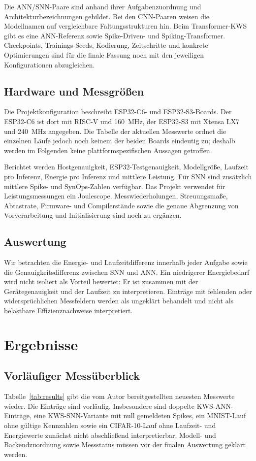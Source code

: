 \documentclass[11pt,a4paper]{article}
\begin{document}
Die ANN/SNN-Paare sind anhand ihrer Aufgabenzuordnung und Architekturbezeichnungen gebildet. Bei den CNN-Paaren weisen die Modellnamen auf vergleichbare Faltungsstrukturen hin. Beim Transformer-KWS gibt es eine ANN-Referenz sowie Spike-Driven- und Spiking-Transformer. Checkpoints, Trainings-Seeds, Kodierung, Zeitschritte und konkrete Optimierungen sind für die finale Fassung noch mit den jeweiligen Konfigurationen abzugleichen.

\subsection{Hardware und Messgrößen}
Die Projektkonfiguration beschreibt ESP32-C6- und ESP32-S3-Boards. Der ESP32-C6 ist dort mit RISC-V und 160~MHz, der ESP32-S3 mit Xtensa LX7 und 240~MHz angegeben. Die Tabelle der aktuellen Messwerte ordnet die einzelnen Läufe jedoch noch keinem der beiden Boards eindeutig zu; deshalb werden im Folgenden keine plattformspezifischen Aussagen getroffen.

Berichtet werden Hostgenauigkeit, ESP32-Testgenauigkeit, Modellgröße, Laufzeit pro Inferenz, Energie pro Inferenz und mittlere Leistung. Für SNN sind zusätzlich mittlere Spike- und SynOps-Zahlen verfügbar. Das Projekt verwendet für Leistungsmessungen ein Joulescope. Messwiederholungen, Streuungsmaße, Abtastrate, Firmware- und Compilerstände sowie die genaue Abgrenzung von Vorverarbeitung und Initialisierung sind noch zu ergänzen.

\subsection{Auswertung}
Wir betrachten die Energie- und Laufzeitdifferenz innerhalb jeder Aufgabe sowie die Genauigkeitsdifferenz zwischen SNN und ANN. Ein niedrigerer Energiebedarf wird nicht isoliert als Vorteil bewertet: Er ist zusammen mit der Gerätegenauigkeit und der Laufzeit zu interpretieren. Einträge mit fehlenden oder widersprüchlichen Messfeldern werden als ungeklärt behandelt und nicht als belastbare Effizienznachweise interpretiert.

\section{Ergebnisse}
\subsection{Vorläufiger Messüberblick}
Tabelle~\ref{tab:results} gibt die vom Autor bereitgestellten neuesten Messwerte wieder. Die Einträge sind vorläufig. Insbesondere sind doppelte KWS-ANN-Einträge, eine KWS-SNN-Variante mit null gemeldeten Spikes, ein MNIST-Lauf ohne gültige Kennzahlen sowie ein CIFAR-10-Lauf ohne Laufzeit- und Energiewerte zunächst nicht abschließend interpretierbar. Modell- und Backendzuordnung sowie Messstatus müssen vor der finalen Auswertung geklärt werden.
\end{document}
